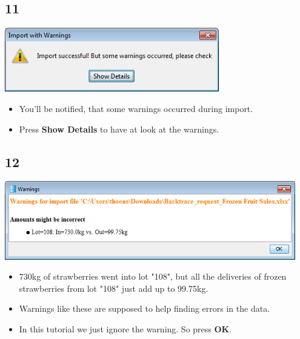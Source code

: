 \documentclass{beamer}
\begin{document}
\subsection{11}
\begin{frame}
	\begin{center}
  		\includegraphics[width=0.7\textwidth]{11.png}
	\end{center}
	\begin{itemize}
		\item You'll be notified, that some warnings occurred during import.
		\item Press \textbf{Show Details} to have at look at the warnings.
	\end{itemize}
\end{frame}

\subsection{12}
\begin{frame}
	\begin{center}
  		\includegraphics[width=0.95\textwidth]{12.png}
	\end{center}
	\begin{itemize}
		\item 730kg of strawberries went into lot "108", but all the deliveries of frozen strawberries from lot "108" just add up to 99.75kg.
		\item Warnings like these are supposed to help finding errors in the data.
		\item In this tutorial we just ignore the warning. So press \textbf{OK}.
	\end{itemize}
\end{frame}
\end{document}
